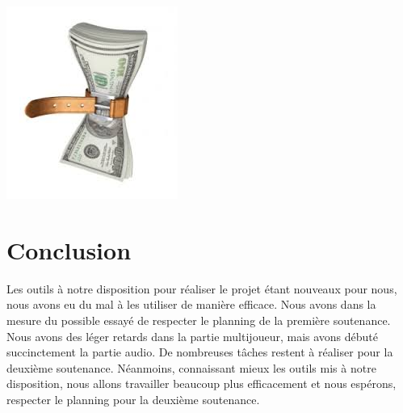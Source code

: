\documentclass[a4paper, 12pt]{article}
\begin{document}
\centerline{\includegraphics[scale=0.7]{images.jpg}}

\section{Conclusion}

Les outils à notre disposition pour réaliser le projet étant  nouveaux pour nous, nous avons eu du mal à les utiliser de manière efficace. Nous avons dans la mesure du possible essayé de respecter le planning de la première soutenance. Nous avons des l\'eger retards dans la partie multijoueur, mais avons d\'ebut\'e succinctement la partie audio. De nombreuses tâches restent à réaliser pour la deuxième soutenance. Néanmoins, connaissant mieux les outils mis à notre disposition, nous allons travailler beaucoup plus efficacement et nous espérons, respecter le planning pour la deuxième soutenance. 
\end{document}
